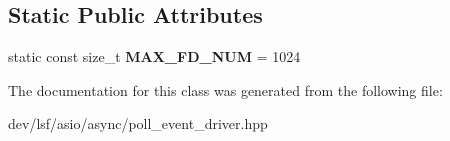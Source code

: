 \subsection*{Static Public Attributes}
\begin{DoxyCompactItemize}
\item 
\hypertarget{classlsf_1_1asio_1_1async_1_1PollEventDriver_a80362a30f2085b5959a70c3259563534}{
static const size\_\-t {\bfseries MAX\_\-FD\_\-NUM} = 1024}
\label{classlsf_1_1asio_1_1async_1_1PollEventDriver_a80362a30f2085b5959a70c3259563534}

\end{DoxyCompactItemize}


The documentation for this class was generated from the following file:\begin{DoxyCompactItemize}
\item 
dev/lsf/asio/async/poll\_\-event\_\-driver.hpp\end{DoxyCompactItemize}
